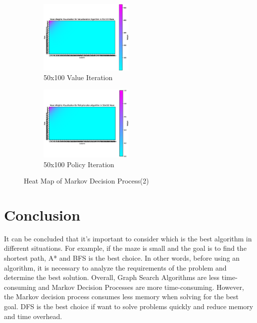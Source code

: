 \documentclass{article}
\begin{document}
\begin{figure}[htp]
    \centering
    \begin{subfigure}[b]{1\textwidth}
        \centering
        \includegraphics[width=0.5\textwidth]{imgs/ValueIteration-50-100.eps}
        \caption{50x100 Value Iteration}
    \end{subfigure}
    \newline
    \begin{subfigure}[b]{1\textwidth}
        \centering
        \includegraphics[width=0.5\textwidth]{imgs/PolicyIteration-50-100.eps}
        \caption{50x100 Policy Iteration}
    \end{subfigure}
    \caption{Heat Map of Markov Decision Process(2)}
\end{figure}


\newpage
\section{Conclusion}
It can be concluded that it's important to consider which is the best algorithm in different situations.
For example, if the maze is small and the goal is to find the shortest path, A* and BFS is the best choice. 
In other words, before using an algorithm, it is necessary to analyze the requirements of the problem and determine the best solution.
Overall, Graph Search Algorithms are less time-consuming and Markov Decision Processes are more time-consuming.  
However, the Markov decision process consumes less memory when solving for the best goal.
DFS is the best choice if want to solve problems quickly and reduce memory and time overhead.
\end{document}
